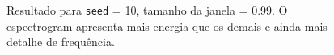 \begin{figure}[ht!]
	\vspace{1mm}	
	\begin{center}
	\end{center}
	\vspace{1mm}
	\caption{Resultado para \texttt{seed} = 10, tamanho da janela = 0.99. O espectrogram apresenta mais energia que os demais e ainda mais detalhe de frequência.}
	\label{fig:seed10_0.99}
\end{figure}